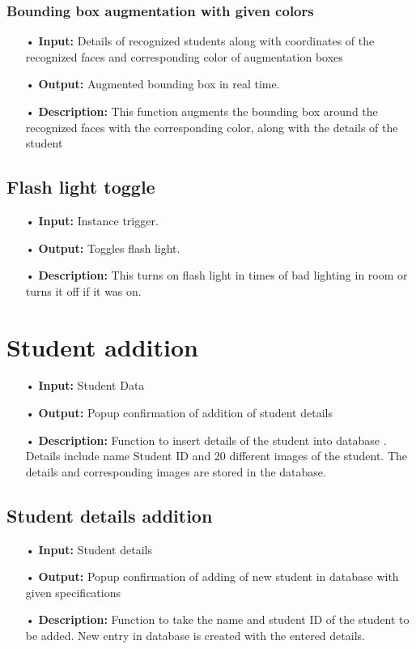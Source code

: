 \documentclass{scrreprt}
\begin{document}
\subsubsection{Bounding box augmentation with given colors}
\begin{enumerate}
\item[•] \textbf{Input:} Details of recognized students along with coordinates of the recognized faces and corresponding
color of augmentation boxes
\item[•] \textbf{Output:} Augmented bounding box in real time.
\item[•] \textbf{Description:} This function augments the bounding box around the recognized faces with the corresponding
color, along with the details of the student
\end{enumerate}

\subsection{Flash light toggle}
\begin{enumerate}
\item[•] \textbf{Input:} Instance trigger.
\item[•] \textbf{Output:} Toggles flash light.
\item[•] \textbf{Description:} This turns on flash light in times of bad lighting in room or turns it off if it was on.
\end{enumerate}

\section{Student addition}
\begin{enumerate}

\item[•]  \textbf{Input:} Student Data
\item[•]  \textbf{Output:}
Popup confirmation of addition of student details
\item[•]  \textbf{Description:}
Function to insert details of the student into database . Details include name Student ID and 20 different images of the student. The
details and corresponding images are stored in the database.
\end{enumerate}

\subsection{Student details addition}
\begin{enumerate}
\item[•]  \textbf{Input:}
Student details
\item[•]  \textbf{Output:}
Popup confirmation of adding of new student in database with given specifications
\item[•]  \textbf{Description:}
Function to take the name and student ID of the student
to be added. New entry in database is created with the entered details.
\end{enumerate}
\end{document}
